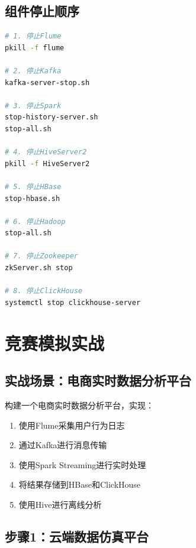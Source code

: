 \documentclass[12pt,a4paper]{article}
\begin{document}
\subsection{组件停止顺序}

\begin{lstlisting}[language=bash]
# 1. 停止Flume
pkill -f flume

# 2. 停止Kafka
kafka-server-stop.sh

# 3. 停止Spark
stop-history-server.sh
stop-all.sh

# 4. 停止HiveServer2
pkill -f HiveServer2

# 5. 停止HBase
stop-hbase.sh

# 6. 停止Hadoop
stop-all.sh

# 7. 停止Zookeeper
zkServer.sh stop

# 8. 停止ClickHouse
systemctl stop clickhouse-server
\end{lstlisting}

\section{竞赛模拟实战}

\subsection{实战场景：电商实时数据分析平台}

\begin{theorybox}[场景描述]
构建一个电商实时数据分析平台，实现：
\begin{enumerate}
    \item 使用Flume采集用户行为日志
    \item 通过Kafka进行消息传输
    \item 使用Spark Streaming进行实时处理
    \item 将结果存储到HBase和ClickHouse
    \item 使用Hive进行离线分析
\end{enumerate}
\end{theorybox}

\subsection{步骤1：云端数据仿真平台}
\end{document}
